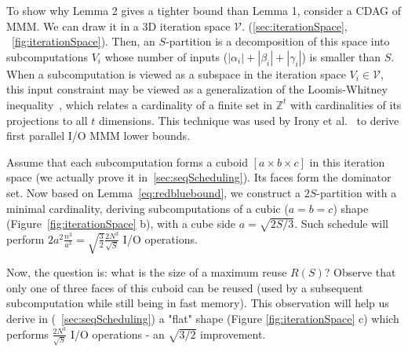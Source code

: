 \documentclass[sigplan,review,anonymous]{acmart}\settopmatter{printfolios=true,printccs=false,printacmref=false}
\begin{document}
\label{sec:mmmExample}


To show why Lemma 2 gives a tighter bound than Lemma 1, consider a CDAG of 
MMM.  We can draw it in a 3D iteration space $\mathcal{V}$.
(\cref{sec:iterationSpace}, ~\ref{fig:iterationSpace}). Then,
an $S$-partition is a decomposition of this space into subcomputations $V_i$ 
whose
number of inputs ($|\alpha_i| + |\beta_i| + |\gamma_i|$) is smaller than $S$.
When a subcomputation is viewed as a subspace in the iteration space $V_i \in 
\mathcal{V}$, this input constraint may be viewed as a generalization of the 
Loomis-Whitney inequality~\cite{loomisWhitney}, which relates a cardinality of 
a 
finite set in $\mathbb{Z}^t$ with cardinalities of its projections to all $t$ 
dimensions. This technique was used by Irony et al.~\cite{loomisApplied} to 
derive first parallel I/O MMM lower bounds.

Assume that each subcomputation forms a cuboid $[a \times b \times c]$ in this
iteration space (we actually prove it in~\cref{sec:seqScheduling}). Its
faces form the dominator set.  Now based on Lemma~\ref{eq:redbluebound}, we 
construct a $2S$-partition with a
minimal cardinality, deriving subcomputations of a cubic ($a = b = c$) shape
(Figure~\ref{fig:iterationSpace} b), with a cube side $a = \sqrt{2S/3}$.  Such
schedule will perform $2a^2 \frac{n^3}{a^3} =
\sqrt{\frac{3}{2}}\frac{2N^3}{\sqrt{S}}$ I/O operations. 

Now, the question is: what is the size of a maximum reuse $R(S)$? Observe that
only one of three faces of this cuboid can be reused (used by a subsequent
subcomputation while still being in fast memory). This observation will help us
derive in (~\cref{sec:seqScheduling}) a "flat" shape (Figure 
\ref{fig:iterationSpace}
c) which performs $\frac{2N^3}{\sqrt{S}}$ I/O operations - an $\sqrt{3/2}$
improvement.
\end{document}
